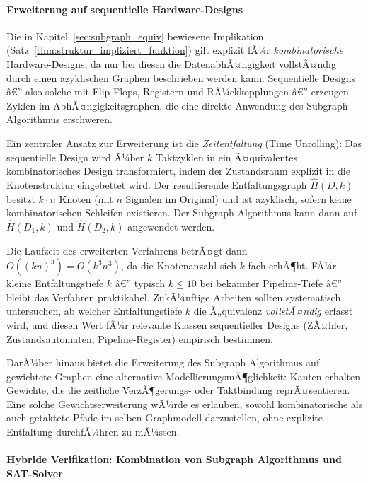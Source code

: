 ﻿\documentclass[12pt,a4paper]{report}
\begin{document}
\paragraph{Erweiterung auf sequentielle Hardware-Designs}

Die in Kapitel~\ref{sec:subgraph_equiv} bewiesene Implikation (Satz~\ref{thm:struktur_impliziert_funktion})
gilt explizit fÃ¼r \emph{kombinatorische} Hardware-Designs, da nur bei diesen die
DatenabhÃ¤ngigkeit vollstÃ¤ndig durch einen azyklischen Graphen beschrieben werden kann.
Sequentielle Designs â€” also solche mit Flip-Flops, Registern und RÃ¼ckkopplungen â€” erzeugen
Zyklen im AbhÃ¤ngigkeitsgraphen, die eine direkte Anwendung des Subgraph Algorithmus
erschweren.

Ein zentraler Ansatz zur Erweiterung ist die \emph{Zeitentfaltung} (Time Unrolling):
Das sequentielle Design wird Ã¼ber $k$ Taktzyklen in ein Ã¤quivalentes kombinatorisches
Design transformiert, indem der Zustandsraum explizit in die Knotenstruktur eingebettet
wird. Der resultierende Entfaltungsgraph $\hat{H}(D, k)$ besitzt $k \cdot n$ Knoten (mit
$n$ Signalen im Original) und ist azyklisch, sofern keine kombinatorischen Schleifen
existieren. Der Subgraph Algorithmus kann dann auf $\hat{H}(D_1, k)$ und $\hat{H}(D_2, k)$
angewendet werden.

Die Laufzeit des erweiterten Verfahrens betrÃ¤gt dann $O((kn)^3) = O(k^3 n^3)$, da die
Knotenanzahl sich $k$-fach erhÃ¶ht. FÃ¼r kleine Entfaltungstiefe $k$ â€” typisch $k \leq 10$
bei bekannter Pipeline-Tiefe â€” bleibt das Verfahren praktikabel. ZukÃ¼nftige Arbeiten
sollten systematisch untersuchen, ab welcher Entfaltungstiefe $k$ die Ã„quivalenz
\emph{vollstÃ¤ndig} erfasst wird, und diesen Wert fÃ¼r relevante Klassen sequentieller
Designs (ZÃ¤hler, Zustandsautomaten, Pipeline-Register) empirisch bestimmen.

DarÃ¼ber hinaus bietet die Erweiterung des Subgraph Algorithmus auf gewichtete Graphen
eine alternative ModellierungsmÃ¶glichkeit: Kanten erhalten Gewichte, die die zeitliche
VerzÃ¶gerungs- oder Taktbindung reprÃ¤sentieren. Eine solche Gewichtserweiterung wÃ¼rde es
erlauben, sowohl kombinatorische als auch getaktete Pfade im selben Graphmodell
darzustellen, ohne explizite Entfaltung durchfÃ¼hren zu mÃ¼ssen.

\paragraph{Hybride Verifikation: Kombination von Subgraph Algorithmus und SAT-Solver}
\end{document}
